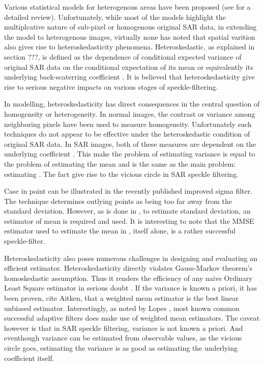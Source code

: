 Various statistical models for heterogenous areas have been proposed (see  for a detailed review). Unfortunately, while most of the models highlight the multiplcative nature of sub-pixel or homogenous original SAR data, in extending the model to heterogenous images, virtually none has noted that spatial varition also gives rise to heteroskedasticity phenomena. Heteroskedastic, as explained in section ???, is defined as the dependence of conditional expected variance of original SAR data on the conditional expectation of its mean or equivalently its underlying back-scaterring coefficient . It is believed that heteroskedasticity give rise to serious negative impacts on various stages of speckle-filtering. 

In modelling, heteroskedasticity has direct consequences in the central question of homogeneity or heterogeneity. In normal images, the contrast or variance among neighboring pixels have been used to measure homogeneity. Unfortunately such techniques do not appear to be effective under the heteroskedastic condition of original SAR data. In SAR images, both of these measures are dependent on the underlying coefficient . This make the problem of estimating variance is equal to the problem of estimating the mean and is the same as the main problem: estimating . The fact give rise to the vicious circle in SAR speckle filtering.

Case in point can be illustrated in the recently published improved sigma filter. The technique determines outlying points as being too far away from the standard deviation. However, as is done in , to estimate standard deviation, an estimator of mean is required and used. It is interesting to note that the MMSE estimator used to estimate the mean in , itself alone, is a rather successful speckle-filter.

Heteroskedasticity also poses numerous challenges in designing and evaluating an efficient estimator. 
Heteroskedasticity directly violates Gauss-Markov theorem's homoskedastic assumption. 
Thus it renders the efficiency of any naive Ordinary Least Square estimator in serious doubt . 
If the variance is known a priori, it has been proven, cite Aitken, that a weighted mean estimator is the best linear unbiased estimator. 
Interestingly, as noted by Lopes , most known common successful adaptive filters    does make use of weighted mean estimators. 
The caveat however is that in SAR speckle filtering, variance is not known a priori. 
And eventhough variance can be estimated from observable values, as the vicious circle goes, estimating the variance is as good as estimating the underlying coefficient  itself.




